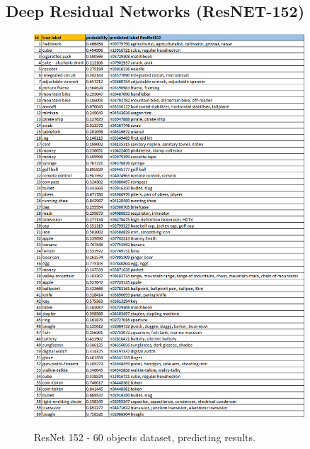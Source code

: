 \documentclass[12pt]{article}
\numberwithin{equation}{section}
\numberwithin{table}{section}
\numberwithin{figure}{section}
\begin{document}
\subsection{Deep Residual Networks (ResNET-152)}
\begin{figure}[H] \centering
	\caption{ResNet 152 - 60 objects dataset, predicting results.}
	\includegraphics[width=0.9\textwidth]{resnet152.png}
	\label{r2}
\end{figure}

\end{document}
